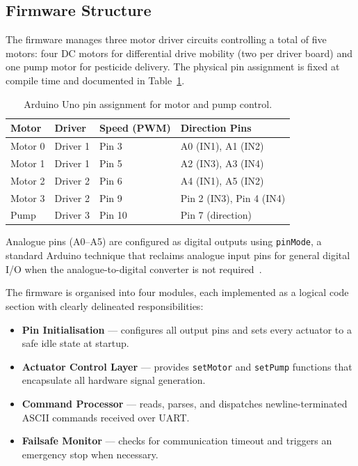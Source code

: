 \subsection{Firmware Structure}
\label{sec:firmware_structure}

The firmware manages three motor driver circuits controlling a total
of five motors: four DC motors for differential drive mobility (two
per driver board) and one pump motor for pesticide delivery. The
physical pin assignment is fixed at compile time and documented in
Table~\ref{tab:pin_map}.

\begin{table}[h]
\centering
\caption{Arduino Uno pin assignment for motor and pump control.}
\label{tab:pin_map}
\begin{tabular}{llll}
\hline
\textbf{Motor} & \textbf{Driver} & \textbf{Speed (PWM)} & \textbf{Direction Pins} \\
\hline
Motor 0 & Driver 1 & Pin 3  & A0 (IN1), A1 (IN2) \\
Motor 1 & Driver 1 & Pin 5  & A2 (IN3), A3 (IN4) \\
Motor 2 & Driver 2 & Pin 6  & A4 (IN1), A5 (IN2) \\
Motor 3 & Driver 2 & Pin 9  & Pin 2 (IN3), Pin 4 (IN4) \\
Pump    & Driver 3 & Pin 10 & Pin 7 (direction) \\
\hline
\end{tabular}
\end{table}

Analogue pins (A0--A5) are configured as digital outputs using
\texttt{pinMode}, a standard Arduino technique that reclaims analogue
input pins for general digital I/O when the analogue-to-digital
converter is not required~\cite{monk2016electronics}.

The firmware is organised into four modules, each implemented as a
logical code section with clearly delineated responsibilities:

\begin{itemize}
    \item \textbf{Pin Initialisation} — configures all output pins
          and sets every actuator to a safe idle state at startup.
    \item \textbf{Actuator Control Layer} — provides \texttt{setMotor}
          and \texttt{setPump} functions that encapsulate all
          hardware signal generation.
    \item \textbf{Command Processor} — reads, parses, and dispatches
          newline-terminated ASCII commands received over UART.
    \item \textbf{Failsafe Monitor} — checks for communication
          timeout and triggers an emergency stop when necessary.
\end{itemize}

